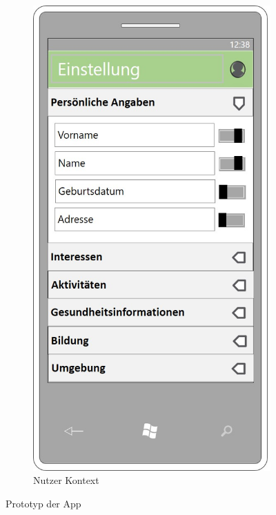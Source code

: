 \begin{figure}[!ht]
\begin{subfigure}{0.32\linewidth}
		\centering
		\includegraphics[width=1\linewidth]{Picture/App-Kontext}
		\caption{Nutzer Kontext}
		\label{fig:prototyp3}
	\end{subfigure}%
	\caption{Prototyp der App}
	\label{fig:prototyp}
\end{figure}











